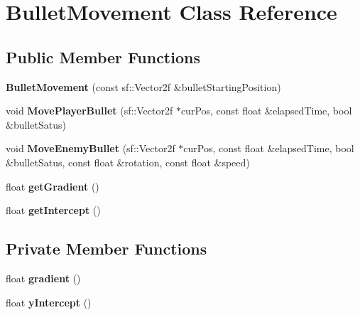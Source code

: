 \hypertarget{class_bullet_movement}{}\section{Bullet\+Movement Class Reference}
\label{class_bullet_movement}
\subsection*{Public Member Functions}
\begin{DoxyCompactItemize}
\item 
\mbox{\label{class_bullet_movement_a828d99972323657caf3dafa00e3a9e5e}} 
{\bfseries Bullet\+Movement} (const sf\+::\+Vector2f \&bullet\+Starting\+Position)
\item 
\mbox{\label{class_bullet_movement_a33b6ad498331352d366e2dab6bc2c712}} 
void {\bfseries Move\+Player\+Bullet} (sf\+::\+Vector2f $\ast$cur\+Pos, const float \&elapsed\+Time, bool \&bullet\+Satus)
\item 
\mbox{\label{class_bullet_movement_ae7109a6098374d23e8dc2360d6546b7c}} 
void {\bfseries Move\+Enemy\+Bullet} (sf\+::\+Vector2f $\ast$cur\+Pos, const float \&elapsed\+Time, bool \&bullet\+Satus, const float \&rotation, const float \&speed)
\item 
\mbox{\label{class_bullet_movement_a4dddd135a0d89dbb8d7b4ec076264f16}} 
float {\bfseries get\+Gradient} ()
\item 
\mbox{\label{class_bullet_movement_ab9716be6fffd1b7f58e5b3be24062e5b}} 
float {\bfseries get\+Intercept} ()
\end{DoxyCompactItemize}
\subsection*{Private Member Functions}
\begin{DoxyCompactItemize}
\item 
\mbox{\label{class_bullet_movement_a84efe87d137c1d0b9e14de5a5c9c7938}} 
float {\bfseries gradient} ()
\item 
\mbox{\label{class_bullet_movement_a165576c782ea8432c14ee86456ff97c4}} 
float {\bfseries y\+Intercept} ()
\end{DoxyCompactItemize}
